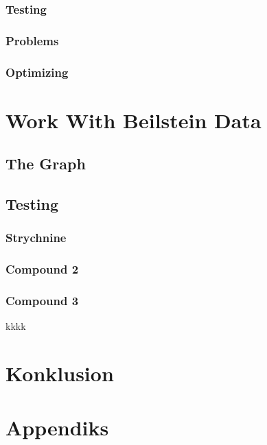 \documentclass[a4paper,10pt,titlepage]{paper}
\begin{document}
\subsubsection{Testing}
\subsubsection{Problems}
\subsubsection{Optimizing}

\section{Work With Beilstein Data}
\subsection{The Graph}
\subsection{Testing}
\subsubsection{Strychnine}
\subsubsection{Compound 2} 
\subsubsection{Compound 3}
kkkk \cite{SynthesisPlans}\\

\section{Konklusion}

\newpage

\printbibliography[type=book, title={Books}]
\printbibliography[type=article, title={Articles}]
\printbibliography[nottype=book, nottype=article, title={Other}]

\newpage
\section{Appendiks}
\end{document}
